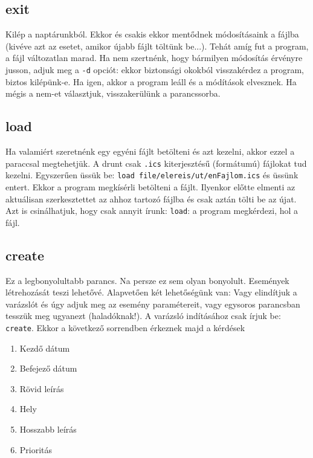\documentclass[a4paper]{article}
\begin{document}
\subsection{exit}

Kilép a naptárunkból. Ekkor és csakis ekkor mentődnek módosításaink a fájlba (kivéve azt az esetet, amikor újabb fájlt töltünk be...). Tehát amíg fut a program, a fájl változatlan marad. Ha nem szertnénk, hogy bármilyen módosítás érvényre jusson, adjuk meg a \texttt{-d} opciót: ekkor biztonsági okokból visszakérdez a program, biztos kilépünk-e. Ha igen, akkor a program leáll és a módítások elvesznek. Ha mégis a nem-et választjuk, visszakerülünk a parancssorba.

\subsection{load}

Ha valamiért szeretnénk egy egyéni fájlt betölteni és azt kezelni, akkor ezzel a paraccsal megtehetjük. A drunt csak \texttt{.ics} kiterjesztésű (formátumú) fájlokat tud kezelni. Egyszerűen üssük be: \texttt{load file/elereis/ut/enFajlom.ics} és üssünk entert. Ekkor a program megkísérli betölteni a fájlt. Ilyenkor előtte elmenti az aktuálisan szerkesztettet az ahhoz tartozó fájlba és csak aztán tölti be az újat. Azt is csinálhatjuk, hogy csak annyit írunk: \texttt{load}: a program megkérdezi, hol a fájl.

\subsection{create}

Ez a legbonyolultabb parancs. Na persze ez sem olyan bonyolult. Események létrehozását teszi lehetővé. Alapvetően két lehetőségünk van: Vagy elindítjuk a varázslót és úgy adjuk meg az esemény paramétereit, vagy egysoros parancsban tesszük meg ugyanezt (haladóknak!). A varázsló indításához csak írjuk be: \texttt{create}. Ekkor a következő sorrendben érkeznek majd a kérdések

\begin{enumerate}
	\item Kezdő dátum
	\item Befejező dátum
	\item Rövid leírás
	\item Hely
	\item Hosszabb leírás
	\item Prioritás
\end{enumerate}
\end{document}
